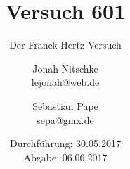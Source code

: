

\title{Versuch 601}
\subtitle{Der Franck-Hertz Versuch}
\author{Jonah Nitschke\\
        lejonah@web.de \and
        Sebastian Pape\\
        sepa@gmx.de}
\date{Durchführung: 30.05.2017\\
      Abgabe: 06.06.2017}



\maketitle
\newpage
\setcounter{page}{1}


\newpage


\printbibliography


